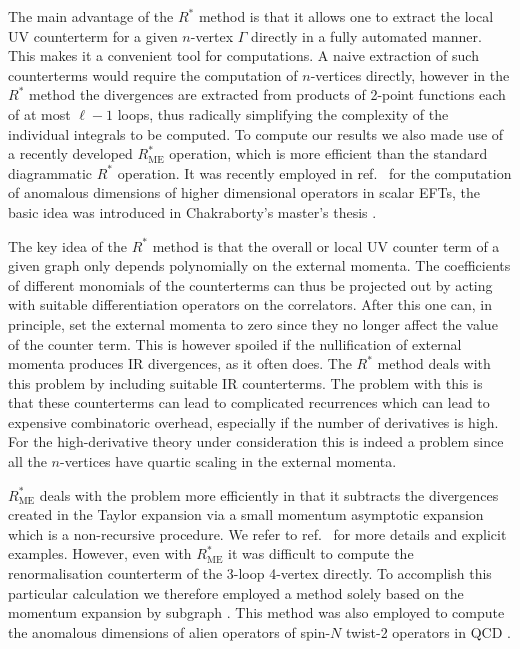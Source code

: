 \documentclass[a4paper,11pt]{article}
\begin{document}
The main advantage of the $R^*$ method is that it allows one to extract the local UV counterterm for a given $n$-vertex $\Gamma$ directly in a fully automated manner. This makes it a convenient tool for computations. A naive extraction of such counterterms would require the computation of $n$-vertices directly, however in the $R^*$ method the divergences are extracted from products of 2-point functions each of at most $\ell-1$ loops, thus radically simplifying the complexity of the individual integrals to be computed. To compute our results we also made use of a recently developed $R^*_{\textrm{ME}}$ operation, which is more efficient than the standard diagrammatic $R^*$ operation. It was recently employed in ref.~\cite{Henriksson:2025hwi} for the computation of anomalous dimensions of higher dimensional operators in scalar EFTs, the basic idea was introduced in Chakraborty's master's thesis \cite{Chakraborty2023}.

The key idea of the $R^*$ method is that the overall or local UV counter term of a given graph only depends polynomially on the external momenta. The coefficients of different monomials of the counterterms can thus be projected out by acting with suitable differentiation operators on the correlators. After this one can, in principle, set the external momenta to zero since they no longer affect the value of the counter term. This is however spoiled if the  nullification of external momenta produces IR divergences, as it often does. The $R^*$ method deals with this problem by including suitable IR counterterms. The problem with this is that these counterterms can lead to complicated recurrences which can lead to expensive combinatoric overhead, especially if the number of derivatives is high. For the high-derivative theory under consideration this is indeed a problem since all the $n$-vertices have quartic scaling in the external momenta. 

$R^*_{\textrm{ME}}$ deals with the problem more efficiently in that it subtracts the divergences created in the Taylor expansion via a small momentum asymptotic expansion which is a non-recursive procedure. We refer to ref.~\cite{Henriksson:2025hwi} for more details and explicit examples. However, even with $R^*_{\textrm{ME}}$ it was difficult to compute the renormalisation counterterm of the $3$-loop 4-vertex directly. To accomplish this particular calculation we therefore employed a method solely based on the momentum expansion
by subgraph \cite{Chetyrkin:1982zq,Chetyrkin:1983qlc,Gorishnii:1983su,Gorishnii:1986gn,Chetyrkin:1988zz,Chetyrkin:1988cu,LlewellynSmith:1987jx,Gorishnii:1989dd,Smirnov:1990rz,Smirnov:1994tg,Smirnov:2002pj,Chakraborty:2024uzz}. This method was also employed to compute the anomalous dimensions of alien operators of spin-$N$ twist-2 operators in QCD \cite{VanThurenhout:2025vui,Falcioni:2024xav,Falcioni:2023luc,Falcioni:2023vqq,Falcioni:2024xyt,Falcioni:2024qpd}. 
\end{document}
